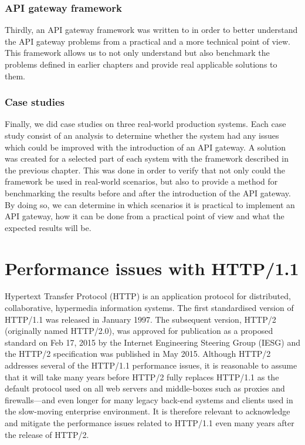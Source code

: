 \documentclass{cslthse-msc}
\begin{document}
\subsection{API gateway framework}
Thirdly, an API gateway framework was written to in order to better understand the API gateway problems from a practical and a more technical point of view. This framework allows us to not only understand but also benchmark the problems defined in earlier chapters and provide real applicable solutions to them.

\subsection{Case studies}
Finally, we did case studies on three real-world production systems. Each case study consist of an analysis to determine whether the system had any issues which could be improved with the introduction of an API gateway. A solution was created for a selected part of each system with the framework described in the previous chapter. This was done in order to verify that not only could the framework be used in real-world scenarios, but also to provide a method for benchmarking the results before and after the introduction of the API gateway. By doing so, we can determine in which scenarios it is practical to implement an API gateway, how it can be done from a practical point of view and what the expected results will be.

\chapter{Performance issues with HTTP/1.1}
Hypertext Transfer Protocol (HTTP) is an application protocol for distributed, collaborative, hypermedia information systems\cite{rfc2616}. The first standardised version of HTTP/1.1 was released in January 1997\cite{rfc2068}. The subsequent version, HTTP/2 (originally named HTTP/2.0), was approved for publication as a proposed standard on Feb 17, 2015 by the Internet Engineering Steering Group (IESG) and the HTTP/2 specification was published in May 2015\cite{rfc_7540}. Although HTTP/2 addresses several of the HTTP/1.1 performance issues, it is reasonable to assume that it will take many years before HTTP/2 fully replaces HTTP/1.1 as the default protocol used on all web servers and middle-boxes such as proxies and firewalls---and even longer for many legacy back-end systems and clients used in the slow-moving enterprise environment. It is therefore relevant to acknowledge and mitigate the performance issues related to HTTP/1.1 even many years after the release of HTTP/2.
\end{document}
